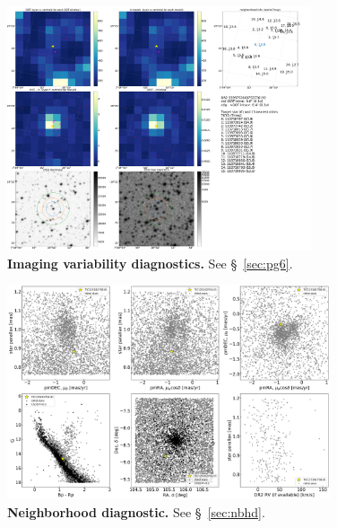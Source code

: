 \documentclass[12pt,twocolumn,tighten]{aastex62}
\begin{document}
\begin{figure}[!h]
	\begin{center}
		\leavevmode
		\includegraphics[width=0.8\textwidth]{gaiatwo0005599752663752776192-0007_page06.pdf}
	\end{center}
	\vspace{-0.5cm}
	\caption{
		{\bf Imaging variability diagnostics.} See \S~\ref{sec:pg6}.
		\label{fig:pg6}
	}
\end{figure}

\begin{figure}[!h]
	\begin{center}
		\leavevmode
		\includegraphics[width=0.85\textwidth]{TIC125192758O-lb20190918_NGC_2323_neighborhood.png}
	\end{center}
	\vspace{-0.5cm}
	\caption{
		{\bf Neighborhood diagnostic.} See \S~\ref{sec:nbhd}.
		\label{fig:nbhd}
	}
\end{figure}
\end{document}
